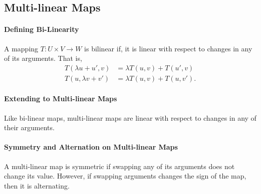 \subsection{Multi-linear Maps}

\paragraph{Defining Bi-Linearity}
A mapping \( T: U \times V \to W \) is bilinear if, it is linear with
respect to changes in any of its arguments.
That is,
\begin{align*}
    T(\lambda u + u', v) &= \lambda T(u, v) + T(u', v) \\
    T(u, \lambda v + v') &= \lambda T(u, v) + T(u, v').
\end{align*}

\paragraph{Extending to Multi-linear Maps}
Like bi-linear maps, multi-linear maps are linear with respect to changes
in any of their arguments.

\paragraph{Symmetry and Alternation on Multi-linear Maps}
A multi-linear map is symmetric if swapping any of its arguments does not
change its value. However, if swapping arguments changes the sign of the
map, then it is alternating.

